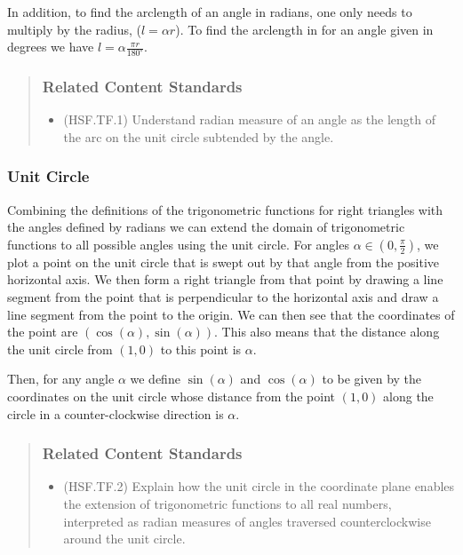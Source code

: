 \documentclass[
]{book}
\providecommand{\tightlist}{%
  \setlength{\itemsep}{0pt}\setlength{\parskip}{0pt}}
\theoremstyle{definition}
\theoremstyle{definition}
\theoremstyle{definition}
\theoremstyle{remark}
\begin{document}
In addition, to find the arclength of an angle in radians, one only needs to multiply by the radius, (\(l=\alpha r\)). To find the arclength in for an angle given in degrees we have \(l=\alpha \frac{\pi r}{180^\circ}\).

\begin{quote}
\hypertarget{related-content-standards-54}{%
\subsubsection*{Related Content Standards}\label{related-content-standards-54}}

\begin{itemize}
\tightlist
\item
  (HSF.TF.1) Understand radian measure of an angle as the length of the arc on the unit circle subtended by the angle.
\end{itemize}
\end{quote}

\hypertarget{unit-circle}{%
\subsubsection{Unit Circle}\label{unit-circle}}

Combining the definitions of the trigonometric functions for right triangles with the angles defined by radians we can extend the domain of trigonometric functions to all possible angles using the unit circle. For angles \(\alpha \in \left(0,\frac{\pi}{2} \right)\), we plot a point on the unit circle that is swept out by that angle from the positive horizontal axis. We then form a right triangle from that point by drawing a line segment from the point that is perpendicular to the horizontal axis and draw a line segment from the point to the origin. We can then see that the coordinates of the point are \((\cos(\alpha),\sin(\alpha))\). This also means that the distance along the unit circle from \((1,0)\) to this point is \(\alpha\).

Then, for any angle \(\alpha\) we define \(\sin(\alpha)\) and \(\cos(\alpha)\) to be given by the coordinates on the unit circle whose distance from the point \((1,0)\) along the circle in a counter-clockwise direction is \(\alpha\).

\begin{quote}
\hypertarget{related-content-standards-55}{%
\subsubsection*{Related Content Standards}\label{related-content-standards-55}}

\begin{itemize}
\tightlist
\item
  (HSF.TF.2) Explain how the unit circle in the coordinate plane enables the extension of trigonometric functions to all real numbers, interpreted as radian measures of angles traversed counterclockwise around the unit circle.
\end{itemize}
\end{quote}
\end{document}
